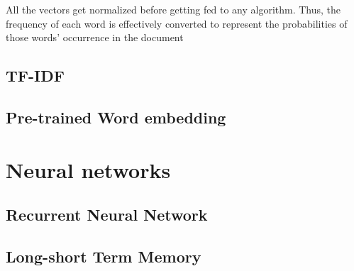 All the vectors get normalized before getting fed to any algorithm. Thus, the frequency of each word is effectively converted to represent the probabilities of those words’ occurrence in the document

\subsection{TF-IDF}
\subsection{Pre-trained Word embedding}

\section{Neural networks}
\subsection{Recurrent Neural Network}
\subsection{Long-short Term Memory}

